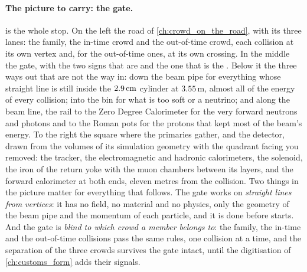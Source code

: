 \paragraph{The picture to carry: the gate.}
 is the whole stop. On the left the road
of \cref{ch:crowd_on_the_road}, with its three lanes: the family, the
in-time crowd and the out-of-time crowd, each collision at its own vertex
and, for the out-of-time ones, at its own crossing. In the middle the gate,
with the two signs that are  and the one that is the
. Below it the three ways out that are not the way in:
down the beam pipe for everything whose straight line is still inside the
$2.9\,\mathrm{cm}$ cylinder at $3.55$\,m, almost all of the energy of every collision;
into the bin for what is too soft or a neutrino; and along the beam line,
the rail to the Zero Degree Calorimeter for the very forward neutrons and
photons and to the Roman pots for the protons that kept most of the beam's
energy. To the right the square where the primaries gather, and the
detector, drawn from the volumes of its simulation geometry with the
quadrant facing you removed: the tracker, the electromagnetic and hadronic calorimeters, the
solenoid, the iron of the return yoke with the muon chambers between its
layers, and the forward calorimeter at both ends, eleven metres from the
collision. Two things in the picture matter for everything that follows.
The gate works on \emph{straight lines from vertices}: it has no field, no
material and no physics, only the geometry of the beam pipe and the
momentum of each particle, and it is done before \GEANT starts. And the
gate is \emph{blind to which crowd a member belongs to}: the family, the
in-time and the out-of-time collisions pass the same rules, one collision
at a time, and the separation of the three crowds survives the gate intact,
until the digitisation of \cref{ch:customs_form} adds their signals.


